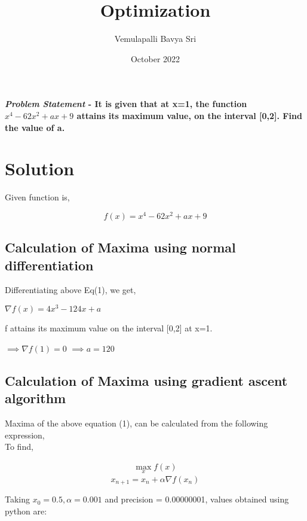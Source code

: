 \documentclass[10pt,twocolumn]{article}
\title{\textbf{Optimization}}
\author{Vemulapalli Bavya Sri}
\date{October 2022}
\begin{document}
\maketitle
\paragraph{\textit{Problem Statement} - It is given that at x=1, the function
$x^4-62x^2+ax+9$ attains its maximum value, on the interval [0,2]. Find the value of a.} 
\section{Solution}
\begin{flushleft}
Given function is,\\
\end{flushleft}
\begin{equation}
\label{eqn:1}
    f(x)=x^4-62x^2+ax+9
\end{equation}
\subsection{Calculation of Maxima using normal differentiation}
\begin{flushleft}
Differentiating above Eq(1), we get,
\end{flushleft}
\center
$\nabla f(x) = 4x^3-124x+a$
\endcenter
\begin{flushleft}
f attains its maximum value on the interval [0,2] at x=1.
\end{flushleft}
\center
$\implies \nabla f(1) =0$\endcenter
\center
$\implies a=120$\endcenter

\begin{flushleft}
\subsection{Calculation of Maxima using gradient ascent algorithm}
\end{flushleft}
\begin{flushleft}
Maxima of the above equation (1), can be calculated from the following expression,\\
To find,
\end{flushleft}
\begin{align}
\max_{x} f(x)
\end{align}  
    \begin{equation}
        x_{n+1}= x_n + \alpha \nabla f(x_n)
    \end{equation}
\begin{flushleft}
Taking $x_0=0.5,\alpha=0.001$ and precision = 0.00000001, values obtained using python are:
\end{flushleft} 
\center
        \\
        \vspace{0.45cm}
        \\
        \vspace{0.45cm}
\endcenter
\end{document}
